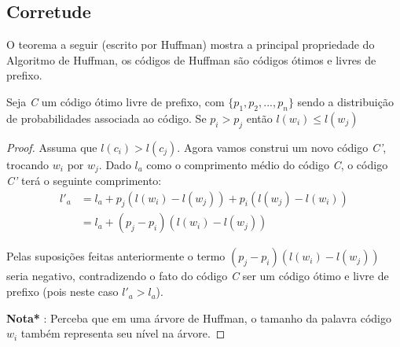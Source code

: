 \subsection{Corretude}
O teorema a seguir (escrito por Huffman) mostra a principal propriedade do Algoritmo de Huffman, os códigos de Huffman são códigos ótimos e livres de prefixo.


\begin{lemma} \label{lemma:dist_prob_avg_size} Seja \emph{C} um código ótimo livre de prefixo, com $\{ p_1, p_2,..., p_n\}$ sendo a distribuição de probabilidades associada ao código. Se $p_i > p_j$ então $l(w_i) \leq l(w_j)$

\begin{proof} 
Assuma que $l(c_i) > l(c_j)$. Agora vamos construi um novo código \emph{C'}, trocando $w_i$ por $w_j$. Dado $l_a$ como o comprimento médio do código \emph{C}, o código \emph{C'} terá o seguinte comprimento:
\begin{align*}
l'_a &= l_a + p_j(l(w_i) - l(w_j)) + p_i(l(w_j) - l(w_i)) \\
&= l_a + (p_j - p_i)(l(w_i) - l(w_j)) 
\end{align*}

Pelas suposições feitas anteriormente o termo $(p_j - p_i)(l(w_i) - l(w_j))$ seria negativo, contradizendo o fato do código \emph{C} ser um código ótimo e livre de prefixo (pois neste caso $l'_a > l_a$).

\textbf{Nota*} : Perceba que em uma árvore de Huffman, o tamanho da palavra código $w_i$ também representa seu nível na árvore.
\end{proof}
\end{lemma}

